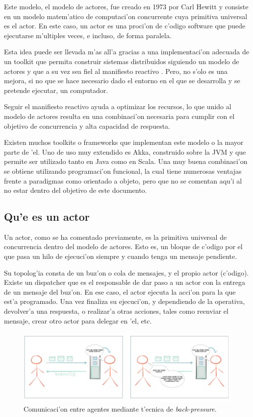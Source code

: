 \documentclass[12pt]{article}
\begin{document}
Este modelo, el modelo de actores, fue creado en 1973 por Carl Hewitt y consiste en un modelo
matem'atico de computaci'on concurrente cuya primitiva universal es el actor. En este caso, un actor es
una proci'on de c'odigo software que puede ejecutarse m'ultiples veces, e incluso,
de forma paralela.

Esta idea puede ser llevada m'as all'a gracias a una implementaci'on adecuada de un toolkit
que permita construir sistemas distribuidos siguiendo un modelo de actores y que a su vez
sea fiel al manifiesto reactivo \cite{reactive-manifest}. Pero, no s'olo es una mejora, si no que se hace necesario dado
el entorno en el que se desarrolla y se pretende ejecutar, un computador.

Seguir el manifiesto reactivo ayuda a optimizar los recursos, lo que unido al modelo de actores
resulta en una combinaci'on necesaria para cumplir con el objetivo de concurrencia y alta capacidad
de respuesta.

Existen muchos toolkits o frameworks que implementan este modelo o la mayor parte de 'el. Uno de uso
muy extendido es Akka, construido sobre la JVM y que permite ser utilizado tanto en Java como en Scala.
Una muy buena combinaci'on se obtiene utilizando programaci'on funcional, la cual tiene numerosas
ventajas frente a paradigmas como orientado a objeto, pero que no se comentan aqu'i al no estar
dentro del objetivo de este documento.

\subsection{Qu'e es un actor}
\label{sub:que es un actor}
Un actor, como se ha comentado previamente,  es la primitiva universal de concurrencia
dentro del modelo de actores. Esto es, un bloque de c'odigo por el que pasa un hilo de
ejecuci'on siempre y cuando tenga un mensaje pendiente.

Su topolog'ia consta de un buz'on o cola de mensajes, y el propio actor (c'odigo). Existe un dispatcher
que es el responsable de dar paso a un actor con la entrega de un mensaje del buz'on.
En ese caso, el actor ejecuta la acci'on para la que est'a programado. Una vez finaliza su
ejecuci'on, y dependiendo de la operativa, devolver'a una respuesta, o realizar'a otras acciones,
tales como reenviar el mensaje, crear otro actor para delegar en 'el, etc.

\begin{figure}[h]
\centering
\includegraphics[scale=0.3]{backpressure}
\caption{Comunicaci'on entre agentes mediante t'ecnica de \textit{back-pressure}.}
\end{figure}
\end{document}
